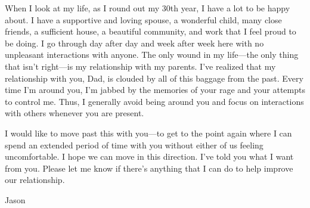\documentclass[12pt]{letter}
\begin{document}
\begin{letter}{}
When I look at my life, as I round out my 30th year, I have a lot to be happy about.  I have a supportive and loving spouse, a wonderful child, many close friends, a sufficient house, a beautiful community, and work that I feel proud to be doing.  I go through day after day and week after week here with no unpleasant interactions with anyone.  The only wound in my life---the only thing that isn't right---is my relationship with my parents.  I've realized that my relationship with you, Dad, is clouded by all of this baggage from the past.  Every time I'm around you, I'm jabbed by the memories of your rage and your attempts to control me.  Thus, I generally avoid being around you and focus on interactions with others whenever you are present.

I would like to move past this with you---to get to the point again where I can spend an extended period of time with you without either of us feeling uncomfortable.  I hope we can move in this direction.  I've told you what I want from you.  Please let me know if there's anything that I can do to help improve our relationship.

\vspace{.25in}

\noindent Jason

\end{letter}
\end{document}
